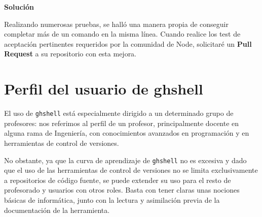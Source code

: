 {\normalsize {\bfseries Solución}}
\bigskip

Realizando numerosas pruebas, se halló una manera propia de conseguir completar más de un comando en la misma línea. Cuando realice los test de aceptación pertinentes requeridos por la comunidad de Node, solicitaré un {\bfseries Pull Request} a su repositorio con esta mejora.


\section{Perfil del usuario de ghshell}
\label{3:sec:4}

El uso de \verb|ghshell| está especialmente dirigido a un determinado grupo de profesores: nos referimos al perfil de un profesor, principalmente docente en alguna rama de Ingeniería, con conocimientos avanzados en programación y en herramientas de control de versiones.
\bigskip

No obstante, ya que la curva de aprendizaje de \verb|ghshell| no es excesiva y dado que el uso de las herramientas de control de versiones no se limita exclusivamente a repositorios de código fuente, se puede extender su uso para el resto de profesorado y usuarios con otros roles. Basta con tener claras unas nociones básicas de informática, junto con la lectura y asimilación previa de la documentación de la herramienta.
